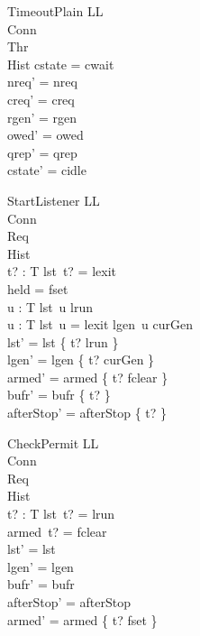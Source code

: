 \documentclass[a4paper,10pt,fleqn]{article}
\begin{document}
\begin{schema}{TimeoutPlain}
  \Delta LL \\
  \Xi Conn \\
  \Xi Thr \\
  \Xi Hist
\where
  cstate = cwait \\
  nreq' = nreq \\
  creq' = creq \\
  rgen' = rgen \\
  owed' = owed \\
  qrep' = qrep \\
  cstate' = cidle
\end{schema}

\begin{schema}{StartListener}
  \Delta LL \\
  \Xi Conn \\
  \Xi Req \\
  \Xi Hist \\
  t? : T
\where
  lst~t? = lexit \\
  held = fset \\
  \forall u : T \spot lst~u \neq lrun \\
  \forall u : T \spot lst~u = lexit \lor lgen~u \neq curGen \\
  lst' = lst \oplus \{ t? \mapsto lrun \} \\
  lgen' = lgen \oplus \{ t? \mapsto curGen \} \\
  armed' = armed \oplus \{ t? \mapsto fclear \} \\
  bufr' = bufr \oplus \{ t? \mapsto \emptyset \} \\
  afterStop' = afterStop \oplus \{ t?  \}
\end{schema}

\begin{schema}{CheckPermit}
  \Delta LL \\
  \Xi Conn \\
  \Xi Req \\
  \Xi Hist \\
  t? : T
\where
  lst~t? = lrun \\
  armed~t? = fclear \\
  lst' = lst \\
  lgen' = lgen \\
  bufr' = bufr \\
  afterStop' = afterStop \\
  armed' = armed \oplus \{ t? \mapsto fset \}
\end{schema}
\end{document}
